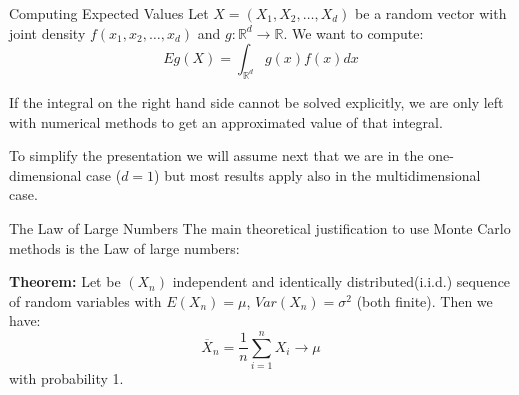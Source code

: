 \documentclass[8pt]{beamer}
\begin{document}







\begin{frame}{Computing Expected Values}
Let $X=(X_1,X_2,\ldots,X_d)$ be a random vector with joint density $f(x_1,x_2,\ldots,x_d)$ and $g: \mathbb{R}^d \rightarrow \mathbb{R}$. We want to compute:
\begin{equation*}
    E g(X)= \int_{\mathbb{R}^d} g(x)f(x) dx
\end{equation*}

If the integral on the right hand side cannot be solved explicitly, we are only left with numerical methods to get an approximated value of that integral. 

\vspace{3mm}

To simplify the presentation we will assume next that we are in the one-dimensional case ($d=1$) but most results apply also in the multidimensional case.
\end{frame}

\begin{frame}{The Law of Large Numbers}
The main theoretical justification to use Monte Carlo methods is the Law of large numbers:

\vspace{3mm}

{\bf Theorem:} Let be $(X_n)$ independent and identically distributed(i.i.d.) sequence of random variables with 
$E(X_n)=\mu$, $Var(X_n)=\sigma^2$ (both finite). Then we have:\\
\begin{equation*}
\overline{X}_n=\frac{1}{n} \sum_{i=1}^n X_i\rightarrow \mu
\end{equation*}
with probability 1.
\end{frame}
\end{document}
